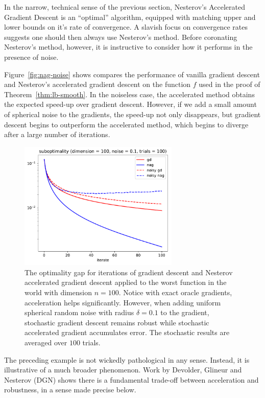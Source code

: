 In the narrow, technical sense of the previous section, Nesterov's Accelerated Gradient 
Descent is an ``optimal'' algorithm, equipped with matching upper and lower bounds on 
it's rate of convergence. A slavish focus on convergence rates suggests one should then
always use Nesterov's method. Before coronating Nesterov's method, however, it
is instructive to consider how it performs in the presence of noise.

Figure~\eqref{fig:nag-noise} shows compares the performance of vanilla gradient
descent and Nesterov's accelerated gradient descent on the function $f$ used in
the proof of Theorem~\eqref{thm:lb-smooth}. In the noiseless case, the
accelerated method obtains the expected speed-up over gradient descent. However,
if we add a small amount of spherical noise to the gradients, the speed-up not
only disappears, but gradient descent begins to outperform the accelerated
method, which begins to diverge after a large number of iterations.

\begin{figure}
\begin{center}
\includegraphics[width=3in]{figures/nag-noise.pdf}
\end{center}
\caption{The optimality gap for iterations of gradient descent and Nesterov accelerated gradient descent applied to the worst function in the world with dimension $n=100$. Notice with exact oracle gradients, acceleration helps significantly. However, when adding uniform spherical random noise with radius $\delta=0.1$ to the gradient, stochastic gradient descent remains robust while stochastic accelerated gradient accumulates error. The stochastic results are averaged over $100$ trials.}
\label{fig:nag-noise}
\end{figure}

The preceding example is not wickedly pathological in any sense. Instead, it is
illustrative of a much broader phenomenon. Work by Devolder, Glineur and
Nesterov (DGN) \cite{devolder2014first} shows there is a
fundamental trade-off between acceleration and robustness, in a sense
made precise below. 

